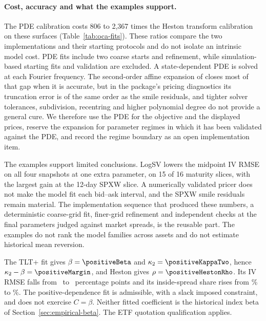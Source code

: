 \paragraph{Cost, accuracy and what the examples support.}
The PDE calibration costs 806 to 2,367 times the Heston transform calibration on these surfaces
(Table~\ref{tab:oca-fits}). These ratios compare the two implementations and their
starting protocols and do not isolate an intrinsic model cost. PDE fits include
two coarse starts and refinement, while simulation-based starting fits and validation
are excluded. A state-dependent PDE is solved at each Fourier frequency.
The second-order affine expansion of \citet{SeppRakhmonovLogSV} closes most of that
gap when it is accurate, but in the package's pricing diagnostics its truncation error is of
the same order as the smile residuals, and tighter solver tolerances, subdivision,
recentring and higher polynomial degree do not provide a general cure. We therefore
use the PDE for the objective and the displayed prices, reserve the expansion for
parameter regimes in which it has been validated against the PDE, and record the
regime boundary as an open implementation item.

The examples support limited conclusions. LogSV lowers the midpoint IV
RMSE on all four snapshots at one extra parameter, on 15 of 16 maturity
slices, with the largest gain at the 12-day SPXW slice. A numerically validated pricer does not make the model
fit each bid--ask interval, and the SPXW smile residuals remain material. The
implementation sequence that produced these numbers, a deterministic coarse-grid
fit, finer-grid refinement and independent checks at the final parameters judged
against market spreads, is the reusable part. The examples do not rank the model
families across assets and do not estimate historical mean reversion.

The TLT+ fit gives $\beta=\positiveBeta$ and $\kappa_2=\positiveKappaTwo$, hence
$\kappa_2-\beta=\positiveMargin$, and Heston gives $\rho=\positiveHestonRho$.
Its IV RMSE falls from \rmseHestonTLTpositive\ to \rmseLogSVTLTpositive\ percentage
points and its inside-spread share rises from \insideHestonTLTpositive\% to
\insideLogSVTLTpositive\%. The positive-dependence fit is admissible, with a slack
imposed constraint, and does not exercise $C=\beta$. Neither fitted coefficient is
the historical index beta of Section~\ref{sec:empirical-beta}. The ETF quotation
qualification applies.

